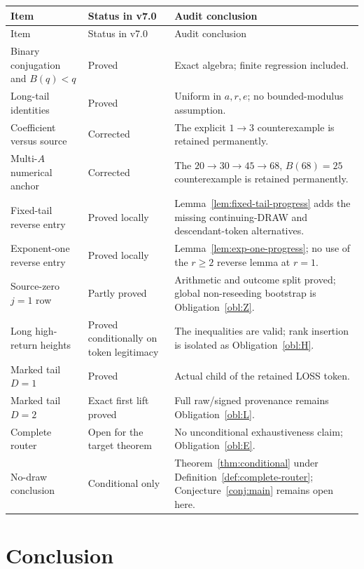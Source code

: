 \documentclass[11pt,a4paper]{article}
\theoremstyle{definition}
\theoremstyle{remark}
\begin{document}
\renewcommand{\arraystretch}{1.18}
\begin{longtable}{>{\raggedright\arraybackslash}p{}
                  >{\raggedright\arraybackslash}p{}
                  >{\raggedright\arraybackslash}p{}}
\toprule
Item & Status in v7.0 & Audit conclusion \\
\midrule
\endfirsthead
\toprule
Item & Status in v7.0 & Audit conclusion \\
\midrule
\endhead
Binary conjugation and $B(q)<q$ & Proved & Exact algebra; finite regression included. \\
Long-tail identities & Proved & Uniform in $a,r,e$; no bounded-modulus assumption. \\
Coefficient versus source & Corrected & The explicit $1\to3$ counterexample is retained permanently. \\
Multi-$A$ numerical anchor & Corrected & The $20\to30\to45\to68$, $B(68)=25$ counterexample is retained permanently. \\
Fixed-tail reverse entry & Proved locally & Lemma~\ref{lem:fixed-tail-progress} adds the missing continuing-DRAW and descendant-token alternatives. \\
Exponent-one reverse entry & Proved locally & Lemma~\ref{lem:exp-one-progress}; no use of the $r\ge2$ reverse lemma at $r=1$. \\
Source-zero $j=1$ row & Partly proved & Arithmetic and outcome split proved; global non-reseeding bootstrap is Obligation~\ref{obl:Z}. \\
Long high-return heights & Proved conditionally on token legitimacy & The inequalities are valid; rank insertion is isolated as Obligation~\ref{obl:H}. \\
Marked tail $D=1$ & Proved & Actual child of the retained LOSS token. \\
Marked tail $D=2$ & Exact first lift proved & Full raw/signed provenance remains Obligation~\ref{obl:L}. \\
Complete router & Open for the target theorem & No unconditional exhaustiveness claim; Obligation~\ref{obl:E}. \\
No-draw conclusion & Conditional only & Theorem~\ref{thm:conditional} under
Definition~\ref{def:complete-router}; Conjecture~\ref{conj:main} remains
open here. \\
\bottomrule
\end{longtable}

\section{Conclusion}
\end{document}
